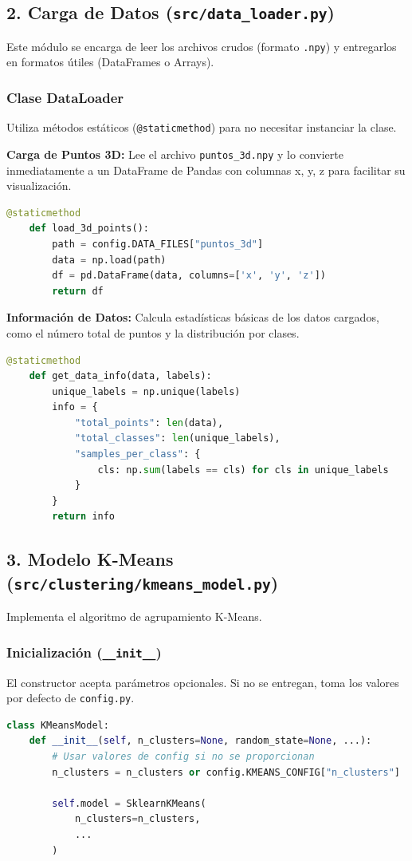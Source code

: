 \documentclass[12pt, a4paper]{article}
\begin{document}
\newpage
\subsection{2. Carga de Datos (\texttt{src/data\_loader.py})}
Este módulo se encarga de leer los archivos crudos (formato \texttt{.npy}) y entregarlos en formatos útiles (DataFrames o Arrays).

\subsubsection{Clase DataLoader}
Utiliza métodos estáticos (\texttt{@staticmethod}) para no necesitar instanciar la clase.

\textbf{Carga de Puntos 3D:}
Lee el archivo \texttt{puntos\_3d.npy} y lo convierte inmediatamente a un DataFrame de Pandas con columnas x, y, z para facilitar su visualización.
\begin{lstlisting}[language=Python]
    @staticmethod
    def load_3d_points():
        path = config.DATA_FILES["puntos_3d"]
        data = np.load(path)
        df = pd.DataFrame(data, columns=['x', 'y', 'z'])
        return df
\end{lstlisting}

\textbf{Información de Datos:}
Calcula estadísticas básicas de los datos cargados, como el número total de puntos y la distribución por clases.
\begin{lstlisting}[language=Python]
    @staticmethod
    def get_data_info(data, labels):
        unique_labels = np.unique(labels)
        info = {
            "total_points": len(data),
            "total_classes": len(unique_labels),
            "samples_per_class": {
                cls: np.sum(labels == cls) for cls in unique_labels
            }
        }
        return info
\end{lstlisting}

\newpage
\subsection{3. Modelo K-Means (\texttt{src/clustering/kmeans\_model.py})}
Implementa el algoritmo de agrupamiento K-Means.

\subsubsection{Inicialización (\texttt{\_\_init\_\_})}
El constructor acepta parámetros opcionales. Si no se entregan, toma los valores por defecto de \texttt{config.py}.
\begin{lstlisting}[language=Python]
class KMeansModel:
    def __init__(self, n_clusters=None, random_state=None, ...):
        # Usar valores de config si no se proporcionan
        n_clusters = n_clusters or config.KMEANS_CONFIG["n_clusters"]
        
        self.model = SklearnKMeans(
            n_clusters=n_clusters,
            ...
        )
\end{lstlisting}
\end{document}
